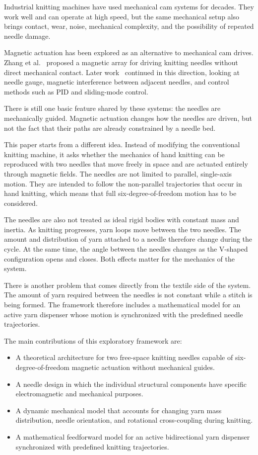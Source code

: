 \documentclass[12pt, a4paper]{article}
\begin{document}
Industrial knitting machines have used mechanical cam systems for decades. They work well and can operate at high speed, but the same mechanical setup also brings contact, wear, noise, mechanical complexity, and the possibility of repeated needle damage.

Magnetic actuation has been explored as an alternative to mechanical cam drives. Zhang et al.~\cite{zhang2019} proposed a magnetic array for driving knitting needles without direct mechanical contact. Later work~\cite{zuo2021, xiong2023, zhang2025} continued in this direction, looking at needle gauge, magnetic interference between adjacent needles, and control methods such as PID and sliding-mode control.

There is still one basic feature shared by these systems: the needles are mechanically guided. Magnetic actuation changes how the needles are driven, but not the fact that their paths are already constrained by a needle bed.

This paper starts from a different idea. Instead of modifying the conventional knitting machine, it asks whether the mechanics of hand knitting can be reproduced with two needles that move freely in space and are actuated entirely through magnetic fields. The needles are not limited to parallel, single-axis motion. They are intended to follow the non-parallel trajectories that occur in hand knitting, which means that full six-degree-of-freedom motion has to be considered.

The needles are also not treated as ideal rigid bodies with constant mass and inertia. As knitting progresses, yarn loops move between the two needles. The amount and distribution of yarn attached to a needle therefore change during the cycle. At the same time, the angle between the needles changes as the V-shaped configuration opens and closes. Both effects matter for the mechanics of the system.

There is another problem that comes directly from the textile side of the system. The amount of yarn required between the needles is not constant while a stitch is being formed. The framework therefore includes a mathematical model for an active yarn dispenser whose motion is synchronized with the predefined needle trajectories.

The main contributions of this exploratory framework are:

\begin{itemize}
\item A theoretical architecture for two free-space knitting needles capable of six-degree-of-freedom magnetic actuation without mechanical guides.
\item A needle design in which the individual structural components have specific electromagnetic and mechanical purposes.
\item A dynamic mechanical model that accounts for changing yarn mass distribution, needle orientation, and rotational cross-coupling during knitting.
\item A mathematical feedforward model for an active bidirectional yarn dispenser synchronized with predefined knitting trajectories.
\end{itemize}
\end{document}
